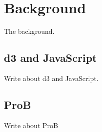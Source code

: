 \section{Background}

The background.

\subsection{d3 and JavaScript}

Write about d3 and JavaScript.

\subsection{ProB}

Write about ProB